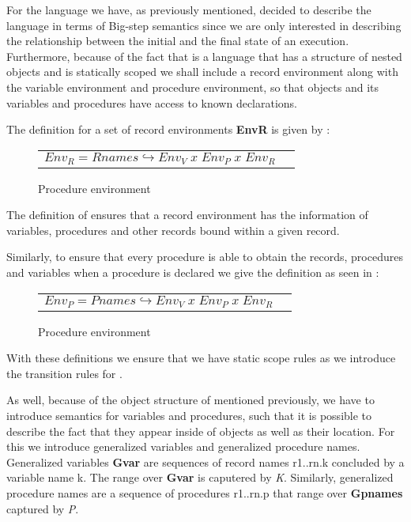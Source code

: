 For the language \dazel{} we have, as previously mentioned, decided to describe the language in terms of Big-step semantics since we are only interested in describing the relationship between the initial and the final state of an execution\cite{SemanWithApplications}. Furthermore, because of the fact that \dazel{} is a language that has a structure of nested objects and is statically scoped we shall include a record environment along with the variable environment and procedure environment, so that objects and its variables and procedures have access to known declarations.

The definition for a set of record environments \textbf{EnvR} is given by :

\begin{figure}[h]
	\centering
	\begin{tabular}{l l}
		$Env_R = Rnames \hookrightarrow Env_V \; x \; Env_P \; x \; Env_R$
	\end{tabular}
	\caption{Procedure environment}
	\label{fig:EnvRDef}
\end{figure}

The definition of  ensures that a record environment has the information of variables, procedures and other records bound within a given record.

Similarly, to ensure that every procedure is able to obtain the records, procedures and variables when a procedure is declared we give the definition as seen in :

\begin{figure}[h]
	\centering
	\begin{tabular}{l l}
		$Env_P = Pnames \hookrightarrow Env_V \; x \; Env_P \; x \; Env_R$
	\end{tabular}
	\caption{Procedure environment}
	\label{fig:EnvPDef}
\end{figure}

With these definitions we ensure that we have static scope rules as we introduce the transition rules for \dazel{}.

As well, because of the object structure of \dazel{} mentioned previously, we have to introduce semantics for variables and procedures, such that it is possible to describe the fact that they appear inside of objects as well as their location. For this we introduce generalized variables and generalized procedure names.
Generalized variables \textbf{Gvar} are sequences of record names r1..rn.k concluded by a variable name k. The range over \textbf{Gvar} is caputered by \textit{K}.  
Similarly, generalized procedure names are a sequence of procedures r1..rn.p that range over \textbf{Gpnames} captured by \textit{P}.


